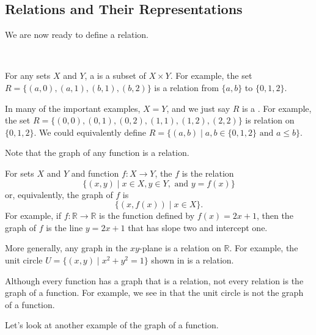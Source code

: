 
\newcommand{\subdefnrelation}{Relations and Their Representations}
\subsection{\subdefnrelation}
\label{sub_defn_relation}

We are now ready to define a relation.

\begin{defn}[Relation]
\label{defn_relation}
~
    \begin{apart}
        \item For any sets $X$ and $Y$, a  is a subset of $X \times Y$.  For example, the set $R=\{(a,0),(a,1),(b,1),(b,2)\}$ is a relation from $\{a,b\}$ to $\{0,1,2\}$.
        \item In many of the important examples, $X=Y$, and we just say $R$ is a .  For example, the set $R=\{(0,0),(0,1),(0,2),(1,1),(1,2),(2,2)\}$ is  relation on $\{0,1,2\}$.  We could equivalently define $R = \{(a,b) \mid a, b \in \{0,1,2\} \text{ and } a \le b\}.$
    \end{apart}
\end{defn}

Note that the graph of any function is a relation. 

\begin{defn}
\label{defn_graph_fn}
    For sets $X$ and $Y$ and function $f: X \to Y$, the  $f$ is the relation
    $$\{(x,y) \mid x \in X, y \in Y, \text{ and } y = f(x)\}$$ or, equivalently, the graph of $f$ is $$\{(x,f(x)) \mid x \in X\}.$$
    For example, if $f: \mathbb{R} \to \mathbb{R}$ is the function defined by $f(x) = 2x+1$, then the graph of $f$ is the line $y=2x+1$ that has slope two and intercept one.
\end{defn}

More generally, any graph in the $xy$-plane is a relation on $\mathbb{R}$.  For example, the unit circle $U = \{ (x,y) \mid x^2+y^2=1\}$ shown in  is a relation.  

Although every function has a graph that is a relation, not every relation is the graph of a function.  For example, we see in  that the unit circle is not the graph of a function.

Let's look at another example of the graph of a function.

